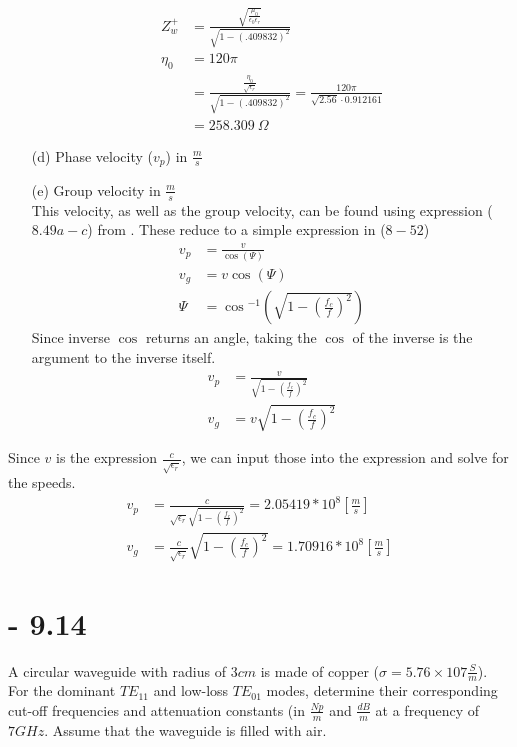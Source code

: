 \documentclass[12pt]{article}
\begin{document}
\begin{itemize}
\begin{align*}
    Z_w^+ &= \frac{\sqrt{\frac{\mu_0}{\epsilon_0\epsilon_r}}}{\sqrt{1-\left(.409832\right)^2}} \\
    \eta_0 &= 120\pi\\
          &= \frac{\frac{\eta_0}{\sqrt{\epsilon_r}}}{\sqrt{1-\left(.409832\right)^2}} = \frac{120\pi}{\sqrt{2.56}\cdot 0.912161}\\
    &= 258.309\ \Omega
  \end{align*}
\item[(d)] Phase velocity ($v_p$) in $\frac{m}{s}$
\item[(e)] Group velocity in $\frac{m}{s}$ \\
  This velocity, as well as the group velocity, can be found using expression ($8.49a-c$) from \cite{balanis_2012}. These reduce to a simple expression in ($8-52$) 
  \begin{align*}
    v_p &= \frac{v}{\cos{(\Psi)}}\\
    v_g &= v\cos{(\Psi)}\\
    \Psi &= \cos{^{-1}\left(\sqrt{1-\left(\frac{f_c}{f}\right)^2}\right)}
  \end{align*}
  Since inverse $\cos$ returns an angle, taking the $\cos$ of the inverse is the argument to the inverse itself.
  \begin{align*}
    v_p &= \frac{v}{\sqrt{1-\left(\frac{f_c}{f}\right)^2}}\\
    v_g &= v\sqrt{1-\left(\frac{f_c}{f}\right)^2}
  \end{align*}
\end{itemize}
\newpage
\noindent
Since $v$ is the expression $\frac{c}{\sqrt{\epsilon_r}}$, we can input those into the expression and solve for the speeds.
  \begin{align*}
    v_p &= \frac{c}{\sqrt{\epsilon_r}\sqrt{1-\left(\frac{f_c}{f}\right)^2}} = 2.05419*10^8 \left[\frac{m}{s}\right] \\
    v_g &= \frac{c}{\sqrt{\epsilon_r}}\sqrt{1-\left(\frac{f_c}{f}\right)^2} = 1.70916*10^8 \left[\frac{m}{s}\right]
  \end{align*}

\section{- 9.14}
A circular waveguide with radius of $3 cm$ is made of copper ($\sigma = 5.76 × 107 \frac{S}{m}$). For the dominant $TE_{11}$ and low-loss $TE_{01}$ modes, determine their corresponding cut-off frequencies and attenuation constants (in $\frac{Np}{m}$ and $\frac{dB}{m}$ at a frequency of $7 GHz$. Assume that the waveguide is filled with air.
\newpage
\end{document}

